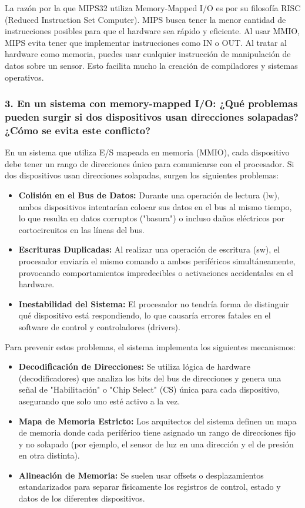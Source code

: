 \documentclass[12pt,a4paper]{article}
\begin{document}
La razón por la que MIPS32 utiliza Memory-Mapped I/O es por su filosofía RISC (Reduced Instruction Set Computer). MIPS busca tener la menor cantidad de instrucciones posibles para que el hardware sea rápido y eficiente. Al usar MMIO, MIPS evita tener que implementar instrucciones como IN o OUT. Al tratar al hardware como memoria, puedes usar cualquier instrucción de manipulación de datos sobre un sensor. Esto facilita mucho la creación de compiladores y sistemas operativos.

\subsubsection{3. En un sistema con memory-mapped I/O: ¿Qué problemas pueden surgir si dos dispositivos usan direcciones solapadas? ¿Cómo se evita este conflicto?}

En un sistema que utiliza E/S mapeada en memoria (MMIO), cada dispositivo debe tener un rango de direcciones único para comunicarse con el procesador. Si dos dispositivos usan direcciones solapadas, surgen los siguientes problemas:
\begin{itemize}
    \item \textbf{Colisión en el Bus de Datos:} Durante una operación de lectura (lw), ambos dispositivos intentarían colocar sus datos en el bus al mismo tiempo, lo que resulta en datos corruptos ("basura") o incluso daños eléctricos por cortocircuitos en las líneas del bus.
    \item \textbf{Escrituras Duplicadas:} Al realizar una operación de escritura (sw), el procesador enviaría el mismo comando a ambos periféricos simultáneamente, provocando comportamientos impredecibles o activaciones accidentales en el hardware.
    \item \textbf{Inestabilidad del Sistema:} El procesador no tendría forma de distinguir qué dispositivo está respondiendo, lo que causaría errores fatales en el software de control y controladores (drivers).
\end{itemize}

Para prevenir estos problemas, el sistema implementa los siguientes mecanismos:
\begin{itemize}
    \item \textbf{Decodificación de Direcciones:} Se utiliza lógica de hardware (decodificadores) que analiza los bits del bus de direcciones y genera una señal de "Habilitación" o "Chip Select" (CS) única para cada dispositivo, asegurando que solo uno esté activo a la vez.
    \item \textbf{Mapa de Memoria Estricto:} Los arquitectos del sistema definen un mapa de memoria donde cada periférico tiene asignado un rango de direcciones fijo y no solapado (por ejemplo, el sensor de luz en una dirección y el de presión en otra distinta).
    \item \textbf{Alineación de Memoria:} Se suelen usar offsets o desplazamientos estandarizados para separar físicamente los registros de control, estado y datos de los diferentes dispositivos.
\end{itemize}
\end{document}
